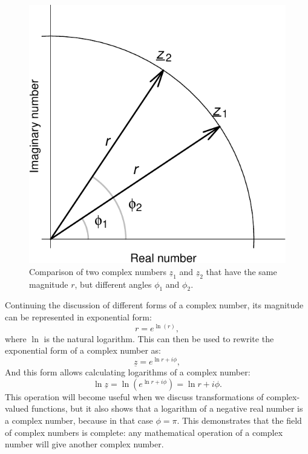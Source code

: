 \documentclass[
]{book}
\begin{document}
\begin{figure}
\centering
\includegraphics{Svetunkov---Svetunkov---Complex-Valued-Econometrics_files/figure-latex/complexPlaneCircle-1.pdf}
\caption{\label{fig:complexPlaneCircle}Comparison of two complex numbers \(\underline{z}_1\) and \(\underline{z}_2\) that have the same magnitude \(r\), but different angles \(\phi_1\) and \(\phi_2\).}
\end{figure}

Continuing the discussion of different forms of a complex number, its magnitude can be represented in exponential form:
\begin{equation*}
    r = e^{\ln(r)},
\end{equation*}
where \(\ln\) is the natural logarithm. This can then be used to rewrite the exponential form of a complex number as:
\begin{equation}
    \underline{z} = e^{\ln r + i \phi} ,
    \label{eq:complexNumberExponentialAll}
\end{equation}
And this form allows calculating logarithms of a complex number:
\begin{equation}
    \ln \underline{z} = \ln \left(e^{\ln r + i \phi} \right) = \ln r + i \phi .
    \label{eq:complexNumberLogarithm}
\end{equation}
This operation will become useful when we discuss transformations of complex-valued functions, but it also shows that a logarithm of a negative real number is a complex number, because in that case \(\phi=\pi\). This demonstrates that the field of complex numbers is complete: any mathematical operation of a complex number will give another complex number.
\end{document}
